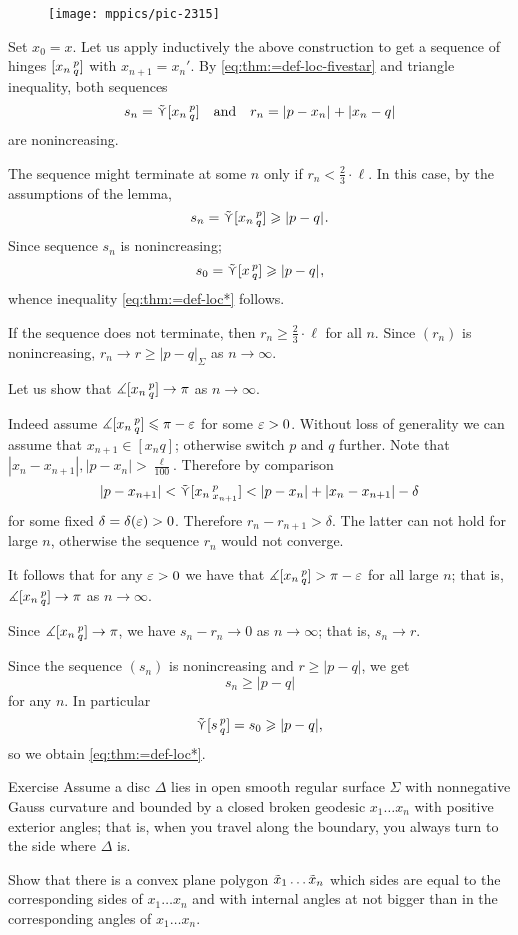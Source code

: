 \begin{figure}[h!]
\centering
\texttt{[image: mppics/pic-2315]}
\end{figure}

Set $x_0=x$.
Let us apply inductively the above construction to get a sequence of hinges  $\hinge{x_n}p q$ with $x_{n+1}=x_n'$.
By \ref{eq:thm:=def-loc-fivestar} and triangle inequality, both sequences
\[s_n=\side \hinge{x_n}pq\quad\text{and}\quad r_n=\dist{p}{x_n}{}+\dist{x_n}{q}{}\]
are nonincreasing.

The sequence might terminate at some $n$ only if $r_n< \tfrac{2}{3}\cdot\ell $.
In this case, by the assumptions of the lemma, 
\[s_n=\side \hinge{x_n}p q\ge\dist{p}{q}{}.\]
Since sequence $s_n$ is nonincreasing;
\[s_0=\side \hinge{x}p q\ge\dist{p}{q}{},\]
whence inequality \ref{eq:thm:=def-loc*} follows.

If the sequence does not terminate, then $r_n\ge\tfrac{2}{3}\cdot\ell$ for all $n$.
Since $(r_n)$ is nonincreasing, $r_n\to r\ge |p-q|_\Sigma$ as $n\to\infty$.

Let us show that $\mangle\hinge{x_n}p q\to \pi$ as $n\to\infty$.

Indeed assume $\mangle\hinge{x_n}p q\le \pi-\eps$ for some $\eps>0$.
Without loss of generality we can assume that $x_{n+1}\in [x_nq]$;
otherwise switch $p$ and $q$ further.
Note that $|x_n-x_{n+1}|,|p-x_n|>\tfrac\ell{100}$.
Therefore by comparison 
\[|p-x_{n+1}|<\side\hinge{x_n}p{x_{n+1}}<|p-x_n|+|x_n-x_{n+1}|-\delta\]
for some fixed $\delta=\delta(\eps)>0$.
Therefore $r_n-r_{n+1}>\delta$.
The latter can not hold for large $n$, otherwise the sequence $r_n$ would not converge.

It follows that for any $\eps>0$ we have that $\mangle\hinge{x_n}p q> \pi-\eps$ for all large $n$;
that is, $\mangle\hinge{x_n}p q\to \pi$ as $n\to\infty$.

Since $\mangle\hinge{x_n}p q\to \pi$, we have 
$s_n-r_n\to 0$ as $n\to\infty$;
that is, $s_n\to r$.

Since the sequence $(s_n)$ is nonincreasing and $r\ge |p-q|$, we get
\[s_n\ge |p-q|\]
for any $n$.
In particular
\[\side\hinge spq=s_0\ge |p-q|,\] so we obtain \ref{eq:thm:=def-loc*}.
\qeds


\begin{thm}{Exercise} 
Assume a disc $\Delta$ lies in open smooth regular surface $\Sigma$ with nonnegative Gauss curvature and bounded by a closed broken geodesic $x_1\dots x_n$ with positive exterior angles; that is, when you travel along the boundary, you always turn to the side where $\Delta$ is.

Show that there is a convex plane polygon $\~x_1\dots \~x_n$ which sides are equal to the corresponding sides of $x_1\dots x_n$ and with internal angles at not bigger than in the corresponding angles  of $x_1\dots x_n$.
\end{thm}

